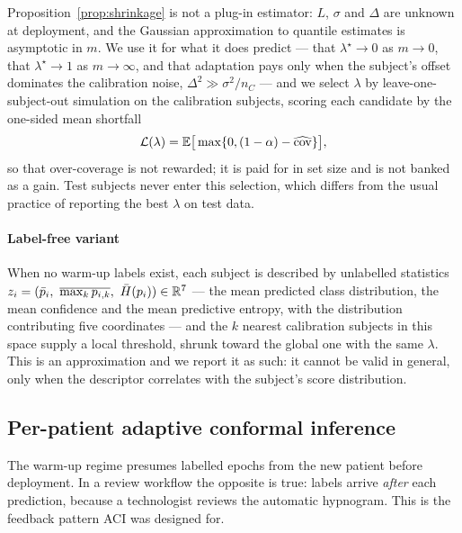 Proposition~\ref{prop:shrinkage} is not a plug-in estimator: $L$, $\sigma$ and
$\Delta$ are unknown at deployment, and the Gaussian approximation to quantile
estimates is asymptotic in $m$. We use it for what it does predict --- that
$\lambda^\star\to0$ as $m\to0$, that $\lambda^\star\to1$ as $m\to\infty$, and
that adaptation pays only when the subject's offset dominates the calibration
noise, $\Delta^2\gg\sigma^2/n_C$ --- and we select $\lambda$ by leave-one-subject-out
simulation on the calibration subjects, scoring each candidate by the
one-sided mean shortfall
\begin{equation}
\mathcal{L}(\lambda)=\mathbb{E}\big[\max\{0,(1-\alpha)-\widehat{\mathrm{cov}}\}\big],
\label{eq:shortfall}
\end{equation}
so that over-coverage is not rewarded; it is paid for in set size and is not
banked as a gain. Test subjects never enter this selection, which differs
from the usual practice of reporting the best $\lambda$ on test data.

\paragraph{Label-free variant}
When no warm-up labels exist, each subject is described by unlabelled
statistics $z_i=(\bar p_i,\ \overline{\max_k p_{i,k}},\ \bar H(p_i))\in\mathbb{R}^{7}$
--- the mean predicted class distribution, the mean confidence and the mean
predictive entropy, with the distribution contributing five coordinates ---
and the $k$ nearest calibration subjects in this space supply a local
threshold, shrunk toward the global one with the same $\lambda$. This is an
approximation and we report it as such: it cannot be valid in general, only
when the descriptor correlates with the subject's score distribution.

\subsection{Per-patient adaptive conformal inference}
\label{sec:method-aci}

The warm-up regime presumes labelled epochs from the new patient before
deployment. In a review workflow the opposite is true: labels arrive
\emph{after} each prediction, because a technologist reviews the automatic
hypnogram. This is the feedback pattern ACI was designed for.

